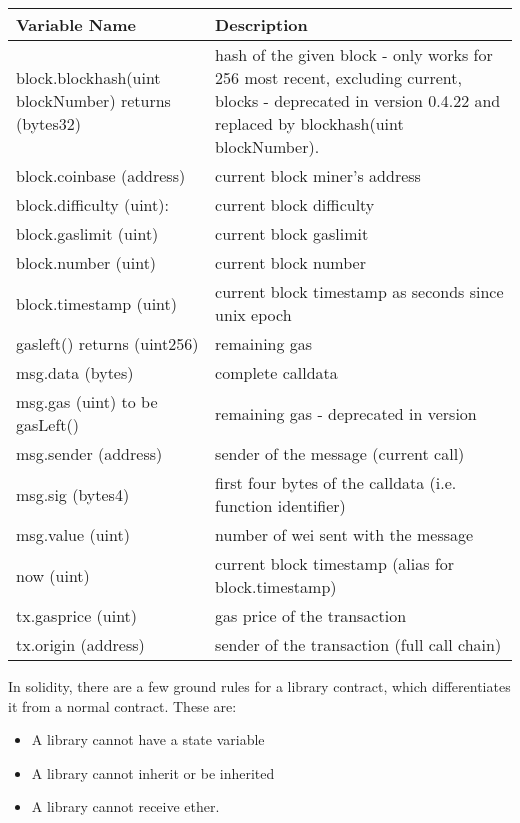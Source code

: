 \begin{table}
\begin{tabular}{p{5cm} p{8cm}}
\hline 
 Variable Name & Description  \\ 
\hline 
block.blockhash(uint blockNumber) returns (bytes32) & hash of the given block - only works for 256 most recent, excluding current, blocks - deprecated in version 0.4.22 and replaced by blockhash(uint blockNumber).  \\ 
\hline 
 block.coinbase (address) & 
 current block miner's address \\ 
\hline 
 block.difficulty (uint): &  current block difficulty \\ 
\hline 
 block.gaslimit (uint) & current block gaslimit  \\ 
\hline 
 block.number (uint) & current block number \\ 
\hline 
 block.timestamp (uint) & current block timestamp as seconds since unix epoch \\ 
\hline 
gasleft() returns (uint256) & remaining gas  \\ 
\hline 
 msg.data (bytes) & complete calldata   \\ 
\hline 
 msg.gas (uint) to be gasLeft() & remaining gas - deprecated in version  \\ 
\hline 
msg.sender (address) & sender of the message (current call) \\ \hline
msg.sig (bytes4) & first four bytes of the calldata (i.e. function identifier) \\ \hline
msg.value (uint) & number of wei sent with the message \\ \hline 
now (uint) & current block timestamp (alias for block.timestamp) \\ \hline
tx.gasprice (uint) & gas price of the transaction \\ \hline 
tx.origin (address) & sender of the transaction (full call chain) \\ \hline   
\end{tabular} 
\end{table}


In solidity, there are a few ground rules for a library contract, which
differentiates it from a normal contract. These are:
\begin{itemize}
\item A library cannot have a state variable
\item A library cannot inherit or be inherited
\item A library cannot receive ether.
\end{itemize}

